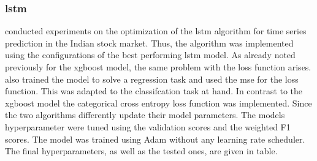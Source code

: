 \subsubsection{\gls{lstm}}
\label{subsub:LSTM_train}
\cite{yadav2020optimizing} conducted experiments on the optimization of the \gls{lstm} algorithm for time series prediction in the Indian stock market. Thus, the algorithm was implemented using the configurations of the best performing \gls{lstm} model. As already noted previously for the \gls{xgboost} model, the same problem with the loss function arises. \citep{yadav2020optimizing} also trained the model to solve a regression task and used the \gls{mse} for the loss function. This was adapted to the classifcation task at hand. In contrast to the \gls{xgboost} model the categorical cross entropy loss function was implemented. Since the two algorithms differently update their model parameters. The models hyperparameter were tuned using the validation scores and the weighted F1 scores. The model was trained using Adam without any learning rate scheduler. The final hyperparameters, as well as the tested ones, are given in table.